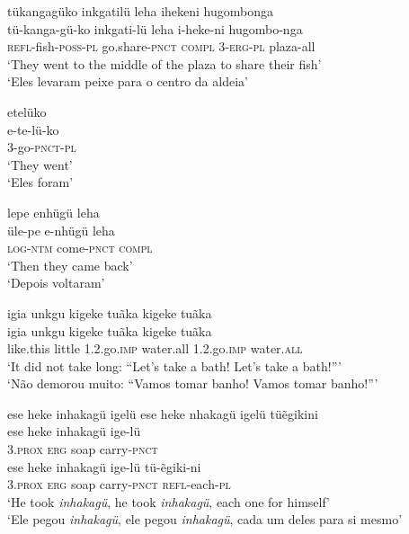 \documentclass[output=paper,
modfonts,nonflat
]{langsci/langscibook}
\begin{document}
\ea tükangagüko inkgatilü leha ihekeni hugombonga \\[.3em]
\gll tü-kanga-gü-ko	inkgati-lü		leha		i-heke-ni	hugombo-nga \\
\textsc{refl}-fish-\textsc{poss-pl} 	go.share-\textsc{pnct} 	\textsc{compl} 	3\textsc{-erg-pl} 	plaza-all \\
\glt ‘They went to the middle of the plaza to share their fish’{\footnotemark}{} \\
‘Eles levaram peixe para o centro da aldeia’ \\
\z

\ea etelüko \\[.3em]
\gll e-te-lü-ko \\
3-go-\textsc{pnct-pl} \\
\glt ‘They went’ \\
‘Eles foram’ \\
\z

\ea lepe enhügü leha \\[.3em]
\gll üle-pe		e-nhügü 	leha \\
\textsc{log-ntm} 	come-\textsc{pnct} 	\textsc{compl} \\
\glt ‘Then they came back’ \\
‘Depois voltaram’ \\
\z

\ea igia unkgu kigeke tuãka kigeke tuãka \\[.3em]
\gll igia		unkgu	kigeke		tuãka kigeke 	tuãka \\
like.this 	little 	1.2.go.\textsc{imp} 	water.all 1.2.go.\textsc{imp} water.\textsc{all} \\
\glt‘It did not take long: “Let's take a bath! Let's take a bath!”’ \\
‘Não demorou muito: “Vamos tomar banho! Vamos tomar banho!”’ \\
\z

\ea ese heke inhakagü igelü ese heke nhakagü igelü tüẽgikini \\[.3em]
\gll ese	heke	inhakagü	ige-lü		\\
\textsc{3.prox} 	\textsc{erg} 	soap 		carry-\textsc{pnct} \\
\gll ese		heke	inhakagü	ige-lü		tü-ẽgiki-ni \\
3.\textsc{prox}	\textsc{erg} 	soap 		carry-\textsc{pnct} 	\textsc{refl}-each-\textsc{pl} \\
\glt ‘He took \emph{inhakagü}, he took \emph{inhakagü}, each one for himself’ \\
‘Ele pegou \emph{inhakagü}, ele pegou \emph{inhakagü}, cada um deles para si mesmo’ \\
\z
\end{document}
